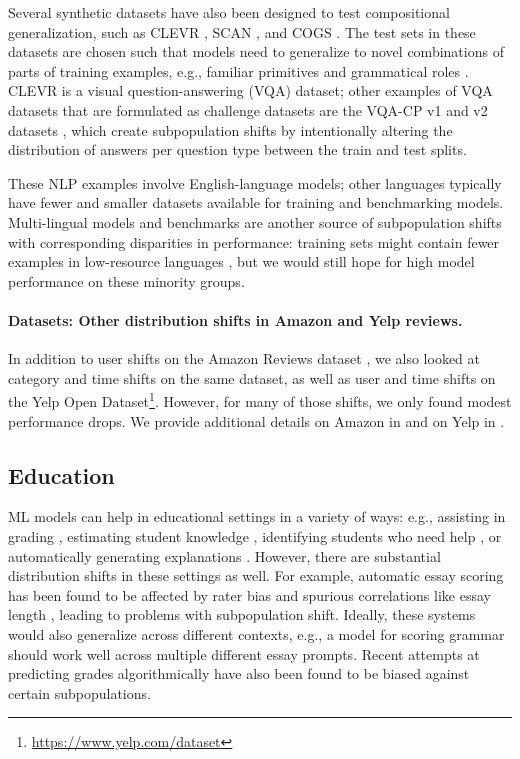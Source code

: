Several synthetic datasets have also been designed to test compositional generalization, such as CLEVR \citep{johnson2017clevr}, SCAN \citep{lake2018generalization}, and COGS \citep{kim2020cogs}. The test sets in these datasets are chosen such that models need to generalize to novel combinations of parts of training examples, e.g., familiar primitives and grammatical roles \citep{kim2020cogs}.
CLEVR is a visual question-answering (VQA) dataset; other examples of VQA datasets that are formulated as challenge datasets are the VQA-CP v1 and v2 datasets \citep{agrawal2018don}, which create subpopulation shifts by intentionally altering the distribution of answers per question type between the train and test splits.

These NLP examples involve English-language models; other languages typically have fewer and smaller datasets available for training and benchmarking models.
Multi-lingual models and benchmarks \citep{conneau2018xnli,conneau2019cross,hu2020xtreme,clark2020tydi} are another source of subpopulation shifts with corresponding disparities in performance:
training sets might contain fewer examples in low-resource languages \citep{nekoto2020participatory},
but we would still hope for high model performance on these minority groups.

\paragraph{Datasets: Other distribution shifts in Amazon and Yelp reviews.}
In addition to user shifts on the Amazon Reviews dataset \citep{ni2019justifying}, we also looked at category and time shifts on the same dataset, as well as user and time shifts on the Yelp Open Dataset\footnote{\url{https://www.yelp.com/dataset}}.
However, for many of those shifts, we only found modest performance drops.
We provide additional details on Amazon in  and on Yelp in .

\subsection{Education}
ML models can help in educational settings in a variety of ways:
e.g., assisting in grading \citep{piech2013tuned,shermis2014state,kulkarni2014scaling,taghipour2016neural},
estimating student knowledge \citep{desmarais2012review,wu2020variational},
identifying students who need help \citep{ahadi2015exploring},
or automatically generating explanations \citep{williams2016axis,wu2019zero}.
However, there are substantial distribution shifts in these settings as well.
For example, automatic essay scoring has been found to be affected by rater bias \citep{amorim2018automated} and spurious correlations like essay length \citep{perelman2014state},
leading to problems with subpopulation shift.
Ideally, these systems would also generalize across different contexts, e.g., a model for scoring grammar should work well across multiple different essay prompts.
Recent attempts at predicting grades algorithmically \citep{bbc2020gcse, broussard2020grades} have also been found to be biased against certain subpopulations.

